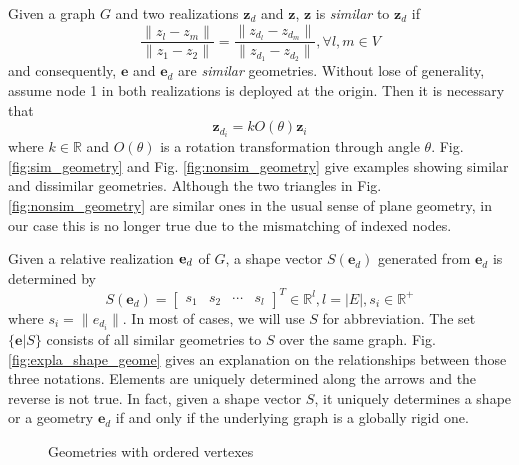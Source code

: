 \documentclass[times]{rncauth}
\newcommand{\be}{\ensuremath \mathbf{e}}
\begin{document}
Given a graph $G$ and two realizations  $\mathbf{z}_d$ and
$\mathbf{z}$, $\mathbf{z}$ is \emph{similar} to $\mathbf{z}_d$
if
\begin{equation}
   \frac{\|z_l-z_m\|}{\|z_1-z_2\|}=\frac{\|z_{d_l}-z_{d_m}\|}{\|z_{d_1}-z_{d_2}\|},
   \forall l,m\in V
\end{equation}
and consequently, $\mathbf{e}$  and $\mathbf{e}_d$ are \emph{similar}
geometries. Without lose of generality, assume node 1 in both
realizations is deployed at the origin. Then it is necessary that
\begin{equation}\label{eq:similar}
\mathbf{z}_{d_i}=k O(\theta)\mathbf{z}_i
\end{equation}
where $k\in\mathbb{R}$ and $O(\theta)$ is a rotation transformation
through angle $\theta$. Fig. \ref{fig:sim_geometry} and Fig.
\ref{fig:nonsim_geometry} give examples showing similar and
dissimilar geometries. Although the two triangles in Fig.
\ref{fig:nonsim_geometry} are similar ones in the usual sense of
plane geometry, in our case this is no longer true due to the mismatching of indexed nodes.

Given a relative realization $\be_d$ of $G$, a shape vector
$S(\mathbf{e}_d)$ generated from $\mathbf{e}_d$ is determined by
$$S(\mathbf{e}_d)=\begin{bmatrix}s_1&s_2&\cdots&s_l\end{bmatrix}^T\in\mathbb{R}^l,l=|E|,s_i\in
\mathbb{R}^+$$ where $s_i=\|e_{d_i}\|$. In most of cases, we will
use $S$ for abbreviation. The set $\{\mathbf{e}|S\}$ consists of all
similar geometries to $S$ over the same graph. Fig.
\ref{fig:expla_shape_geome} gives an explanation on the
relationships between those three notations. Elements are uniquely
determined along the arrows and the reverse is not true. In fact,
given a shape vector $S$, it uniquely determines a shape or a
geometry $\mathbf{e}_d$ if and only if the underlying graph is a
globally rigid one\cite{Anderson08rigidMagazine}.

\begin{figure}
\caption{Geometries with ordered vertexes}
\end{figure}
\end{document}
